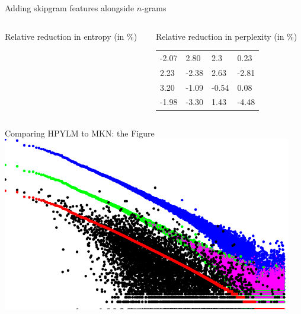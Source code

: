 \begin{frame}{Adding skipgram features alongside $n$-grams}
\begin{columns}[b]
\begin{column}[b]{0.45\textwidth}
\begin{block}{Relative reduction in entropy (in \%)}
                \end{block}
                \vspace{0pt}
            \end{column}
            \quad
            \begin{column}[b]{0.45\textwidth}
                \begin{block}{Relative reduction in perplexity (in \%)}
                \begin{tabular}{llll}
                    -2.07 & 2.80  & 2.3   & 0.23  \\
                    2.23  & -2.38 & 2.63  & -2.81 \\
                    3.20  & -1.09 & -0.54 & 0.08  \\
                    -1.98 & -3.30 & 1.43  & -4.48 \\
                \end{tabular}
                \end{block}
                \vspace{0pt}
            \end{column}            
        \end{columns}

\end{frame}

\begin{frame}{Comparing HPYLM to MKN: the Figure}
    \includegraphics[width=0.95\textwidth]{sgramdata.pdf}
\end{frame}


